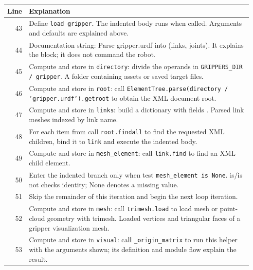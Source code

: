 \documentclass[11pt,a4paper]{book}
\begin{document}
\begin{longtable}{r p{}}

\textbf{Line} & \textbf{Explanation} \\ \hline \endhead

43 & Define \texttt{load\_gripper}. The indented body runs when called. Arguments and defaults are explained above. \\

44 & Documentation string: Parse gripper.urdf into (links, joints). It explains the block; it does not command the robot. \\

45 & Compute and store in \texttt{directory}: divide the operands in \texttt{GRIPPERS\_DIR / gripper}. A folder containing assets or saved target files. \\

46 & Compute and store in \texttt{root}: call \texttt{ElementTree.parse(directory / 'gripper.urdf').getroot} to obtain the XML document root.  \\

47 & Compute and store in \texttt{links}: build a dictionary with fields \texttt{}. Parsed link meshes indexed by link name. \\

48 & For each item from call \texttt{root.findall} to find the requested XML children, bind it to \texttt{link} and execute the indented body. \\

49 & Compute and store in \texttt{mesh\_element}: call \texttt{link.find} to find an XML child element.  \\

50 & Enter the indented branch only when test \texttt{mesh\_element is None}. is/is not checks identity; None denotes a missing value. \\

51 & Skip the remainder of this iteration and begin the next loop iteration. \\

52 & Compute and store in \texttt{mesh}: call \texttt{trimesh.load} to load mesh or point-cloud geometry with trimesh. Loaded vertices and triangular faces of a gripper visualization mesh. \\

53 & Compute and store in \texttt{visual}: call \texttt{\_origin\_matrix} to run this helper with the arguments shown; its definition and module flow explain the result.  \\


\end{longtable}
\end{document}
